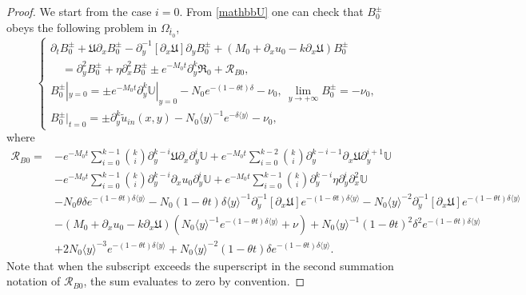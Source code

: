 \documentclass{amsart}
\numberwithin{equation}{section}
\newcommand\y{{{\langle y \rangle}}}
\begin{document}
\begin{proof}
We start from the case $i=0$. From \eqref{mathbbU} one can check that $B_{0}^{\pm}$ obeys the following problem in $\Omega_{\bar{t}_{0}}$,
\begin{equation}\label{B0}
\begin{cases}
\partial_{t}B_{0}^{\pm}
+\mathfrak{U}\partial_{x}B_{0}^{\pm}
-\partial_{y}^{-1}[\partial_{x}\mathfrak{U}]\partial_{y}B_{0}^{\pm}
+(M_{0}+\partial_{x}u_{0}-k\partial_{x}\mathfrak{U})B_{0}^{\pm}\\
\quad=\partial_{y}^{2}B_{0}^{\pm}+\eta\partial_{x}^{2}B_{0}^{\pm}\pm e^{-M_{0}t}\partial_{y}^{k}\mathfrak{R}_{0}+\mathcal{R}_{B0},\\
B_{0}^{\pm}|_{y=0}=\pm e^{-M_{0}t}\partial_{y}^{k}\mathbb{U}|_{y=0}-N_{0}e^{-(1-\theta t)\delta}-\nu_{0},
~\lim\limits_{y\to+\infty}B_{0}^{\pm}=-\nu_{0},\\
B_{0}^{\pm}|_{t=0}=\pm\partial_{y}^{k}\tilde{u}_{in}(x,y)-N_{0}\y^{-1}e^{-\delta\y}-\nu_{0},
\end{cases}
\end{equation}
where
\begin{align*}
\mathcal{R}_{B0}
=&-e^{-M_{0}t}\sum_{i=0}^{k-1}\binom{k}{i}\partial_{y}^{k-i}\mathfrak{U}\partial_{x}\partial_{y}^{i}\mathbb{U}
  +e^{-M_{0}t}\sum_{i=0}^{k-2}\binom{k}{i}\partial_{y}^{k-i-1}\partial_{x}\mathfrak{U}\partial_{y}^{i+1}\mathbb{U}\\
 &-e^{-M_{0}t}\sum_{i=0}^{k-1}\binom{k}{i}\partial_{y}^{k-i}\partial_{x}u_{0}\partial_{y}^{i}\mathbb{U}
  +e^{-M_{0}t}\sum_{i=0}^{k-1}\binom{k}{i}\partial_{y}^{k-i}\eta \partial_{y}^{i}\partial_{x}^{2}\mathbb{U}\\
 &-N_{0}\theta\delta e^{-(1-\theta t)\delta\y}
  -N_{0}(1-\theta t)\delta\y^{-1}\partial_{y}^{-1}[\partial_{x}\mathfrak{U}]e^{-(1-\theta t)\delta\y}
  -N_{0}\y^{-2}\partial_{y}^{-1}[\partial_{x}\mathfrak{U}]e^{-(1-\theta t)\delta\y}\\
 &-(M_{0}+\partial_{x}u_{0}-k\partial_{x}\mathfrak{U})(N_{0}\y^{-1}e^{-(1-\theta t)\delta\y}+\nu)
  +N_{0}\y^{-1}(1-\theta t)^{2}\delta^{2}e^{-(1-\theta t)\delta\y}\\
 &+2N_{0}\y^{-3}e^{-(1-\theta t)\delta\y}
  +N_{0}\y^{-2}(1-\theta t)\delta e^{-(1-\theta t)\delta\y}.
\end{align*}
Note that when the subscript exceeds the superscript in the second summation notation of $\mathcal{R}_{B0}$, the sum evaluates to zero by convention.


\end{proof}
\end{document}
